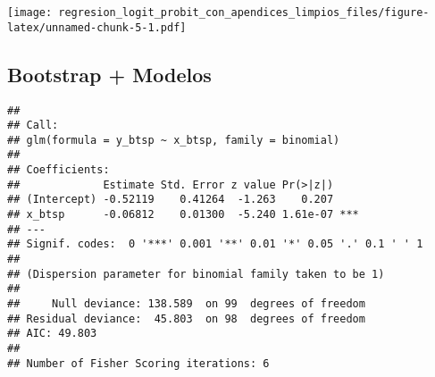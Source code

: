 \documentclass[
]{article}
\newenvironment{Shaded}{\begin{snugshade}}{\end{snugshade}}
\newcommand{\AttributeTok}[1]{\textcolor[rgb]{0.13,0.29,0.53}{#1}}
\newcommand{\ConstantTok}[1]{\textcolor[rgb]{0.56,0.35,0.01}{#1}}
\newcommand{\DecValTok}[1]{\textcolor[rgb]{0.00,0.00,0.81}{#1}}
\newcommand{\FunctionTok}[1]{\textcolor[rgb]{0.13,0.29,0.53}{\textbf{#1}}}
\newcommand{\NormalTok}[1]{#1}
\newcommand{\OtherTok}[1]{\textcolor[rgb]{0.56,0.35,0.01}{#1}}
\newcommand{\SpecialCharTok}[1]{\textcolor[rgb]{0.81,0.36,0.00}{\textbf{#1}}}
\begin{document}
\texttt{[image: regresion\_logit\_probit\_con\_apendices\_limpios\_files/figure-latex/unnamed-chunk-5-1.pdf]}

\subsection{Bootstrap + Modelos}\label{bootstrap-modelos}

\begin{Shaded}
\end{Shaded}

\begin{verbatim}
## 
## Call:
## glm(formula = y_btsp ~ x_btsp, family = binomial)
## 
## Coefficients:
##             Estimate Std. Error z value Pr(>|z|)    
## (Intercept) -0.52119    0.41264  -1.263    0.207    
## x_btsp      -0.06812    0.01300  -5.240 1.61e-07 ***
## ---
## Signif. codes:  0 '***' 0.001 '**' 0.01 '*' 0.05 '.' 0.1 ' ' 1
## 
## (Dispersion parameter for binomial family taken to be 1)
## 
##     Null deviance: 138.589  on 99  degrees of freedom
## Residual deviance:  45.803  on 98  degrees of freedom
## AIC: 49.803
## 
## Number of Fisher Scoring iterations: 6
\end{verbatim}
\end{document}
